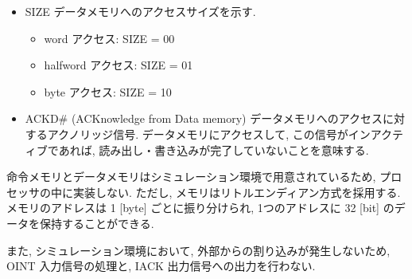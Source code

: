 \documentclass[../specifications.tex]{subfiles}
\begin{document}
\begin{itemize}
    \item SIZE
    \newline データメモリへのアクセスサイズを示す.
    \begin{itemize}
      \item word アクセス: SIZE = 00
      \item halfword アクセス: SIZE = 01
      \item byte アクセス: SIZE = 10
    \end{itemize}

    \item ACKD\# (ACKnowledge from Data memory)
    \newline データメモリへのアクセスに対するアクノリッジ信号.
    データメモリにアクセスして, この信号がインアクティブであれば, 
    読み出し・書き込みが完了していないことを意味する.

  \end{itemize}

  命令メモリとデータメモリはシミュレーション環境で用意されているため, 
  プロセッサの中に実装しない.
  ただし, メモリはリトルエンディアン方式を採用する.
  メモリのアドレスは 1 [byte] ごとに振り分けられ, 
  1つのアドレスに 32 [bit] のデータを保持することができる.

  また, シミュレーション環境において, 外部からの割り込みが発生しないため, 
  OINT 入力信号の処理と, IACK 出力信号への出力を行わない.
\end{document}

